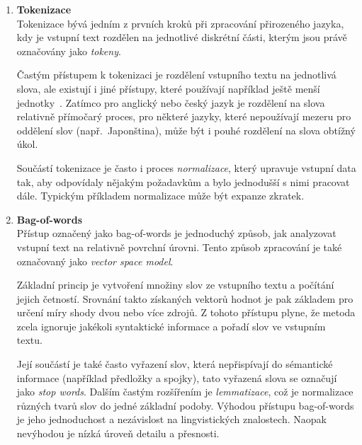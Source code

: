 \begin{enumerate}
	\item \textbf{Tokenizace}\\
	      Tokenizace bývá jedním z prvních kroků při zpracování přirozeného jazyka, kdy je vstupní text
	      rozdělen na jednotlivé diskrétní části, kterým jsou právě označovány jako \emph{tokeny}.~\cite{the_conversational_interface}

	      Častým přístupem k tokenizaci je rozdělení vstupního textu na jednotlivá slova,
	      ale existují i jiné přístupy, které používají například ještě menší jednotky~\cite{yang2024rethinking}.
	      Zatímco pro anglický nebo český jazyk je rozdělení na slova relativně přímočarý proces, pro některé jazyky,
	      které nepoužívají mezeru pro oddělení slov (např.~Japonština), může být i pouhé rozdělení na slova obtížný úkol.~\cite{the_conversational_interface}

	      Součástí tokenizace je často i proces \emph{normalizace}, který upravuje vstupní data tak, aby odpovídaly nějakým požadavkům
	      a bylo jednodušší s nimi pracovat dále.
	      Typickým příkladem normalizace může být expanze zkratek.~\cite{the_conversational_interface}

	      \newpage
	\item \textbf{Bag-of-words}\\
	      Přístup označený jako bag-of-words je jednoduchý způsob, jak analyzovat vstupní text na relativně povrchní úrovni.
	      Tento způsob zpracování je také označovaný jako \emph{vector space model}.~\cite{the_conversational_interface}

	      Základní princip je vytvoření množiny slov ze vstupního textu a počítání jejich četností.
	      Srovnání takto získaných vektorů hodnot je pak základem pro určení míry shody dvou nebo více zdrojů.
	      Z tohoto přístupu plyne, že metoda zcela ignoruje jakékoli syntaktické informace a pořadí slov ve vstupním textu.~\cite{the_conversational_interface}

	      Její součástí je také často vyřazení slov, která nepřispívají do sémantické informace (například předložky a spojky),
	      tato vyřazená slova se označují jako \emph{stop words}.
	      Dalším častým rozšířením je \emph{lemmatizace}, což je normalizace různých tvarů slov do jedné základní podoby.
	      Výhodou přístupu bag-of-words je jeho jednoduchost a nezávislost na lingvistických znalostech.
	      Naopak nevýhodou je nízká úroveň detailu a přesnosti.~\cite{the_conversational_interface}


\end{enumerate}

